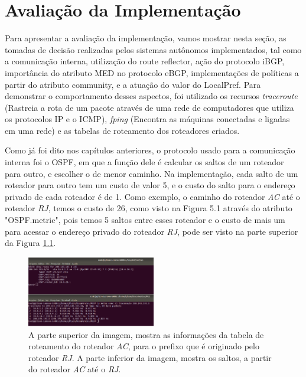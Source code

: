\documentclass[12pt,a4paper]{report}
\begin{document}
\chapter{Avalia\c{c}\~ao da Implementa\c{c}\~ao}

Para apresentar a avalia\c{c}\~ao da implementa\c{c}\~ao, vamos mostrar nesta se\c{c}\~ao, as tomadas de decis\~ao realizadas pelos sistemas aut\^onomos implementados, tal como a comunica\c{c}\~ao interna, utiliza\c{c}\~ao do route reflector, a\c{c}\~ao do protocolo iBGP, import\^ancia do atributo MED no protocolo eBGP, implementa\c{c}\~oes de pol\'iticas a partir do atributo community, e a atua\c{c}\~ao do valor do LocalPref. Para demonstrar o comportamento desses aspectos, foi utilizado os recursos \textit{traceroute} (Rastreia a rota de um pacote atrav\'es de uma rede de computadores que utiliza os protocolos IP e o ICMP), \textit{fping} (Encontra as m\'aquinas conectadas e ligadas em uma rede) e as tabelas de roteamento dos roteadores criados.  

Como j\'a foi dito nos cap\'itulos anteriores, o protocolo usado para a comunica\c{c}\~ao interna foi o OSPF, em que a fun\c{c}\~ao dele \'e calcular os saltos de um roteador para outro, e escolher o de menor caminho. Na implementa\c{c}\~ao, cada salto de um roteador para outro tem um custo de valor 5, e o custo do salto para o endere\c{c}o privado de cada roteador \'e de 1. Como exemplo, o caminho do roteador \textit{AC} at\'e o roteador \textit{RJ}, temos o custo de 26, como visto na Figura 5.1 atrav\'es do atributo "OSPF.metric", pois temos 5 saltos entre esses roteador e o custo de mais um para acessar o endere\c{c}o privado do roteador \textit{RJ}, pode ser visto na parte superior da Figura \ref{fig:imagem9}.

\begin{figure}[!htb]
 \centering
 \includegraphics[width=0.5\textwidth]{Imagens/IMAGEM9}
  \caption{\label{fig:imagem9} A parte superior da imagem, mostra as informa\c{c}\~oes da tabela de roteamento do roteador \textit{AC}, para o prefixo que \'e originado pelo roteador \textit{RJ}. A parte inferior da imagem, mostra os saltos, a partir do roteador \textit{AC} at\'e o \textit{RJ}.}
\end{figure}
\end{document}
